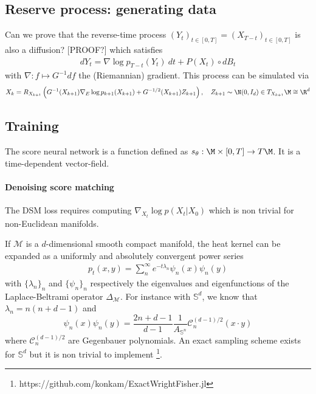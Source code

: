 \subsection{Reserve process: generating data}
Can we prove that the reverse-time process $(Y_t)_{t \in [0,T]} = (X_{T-t})_{t \in [0,T]}$ is also a diffusion? [PROOF?] which satisfies
%
\begin{align}
dY_t = \nabla \log p_{T-t}(Y_t) ~dt + P(X_t) \circ dB_t
\end{align}
with $\nabla: f \mapsto  G^{-1} df$ the (Riemannian) gradient.
%
This process can be simulated via
\begin{align}
X_{k} = R_{X_{k+1}} \left(G^{-1}(X_{k+1}) \nabla_E \log p_{k+1}(X_{k+1}) + G^{-1/2}(X_{k+1}) Z_{k+1} \right), \quad Z_{k+1} \sim \N(0, I_d) \in T_{X_{k+1}}\M \cong \R^d
\end{align}


\subsection{Training}
%
The score neural network is a function defined as $s_\theta: \M \times [0, T] \rightarrow T\M$.
It is a time-dependent vector-field.

\paragraph{Denoising score matching}

The DSM loss requires computing $\nabla_{X_t} \log p(X_t|X_0)$ which is non trivial for non-Euclidean manifolds.

If $\mathcal{M}$ is a $d$-dimensional smooth compact manifold, the heat kernel can be expanded as a uniformly and absolutely convergent power series \citep{jones2008Manifold,li2019Variational}
\begin{align} \label{eq:heat_kernel}
p_t(x, y) = \sum^\infty_n e^{-t \lambda_n} \psi_n(x) \psi_n(y)
\end{align}
with $\{\lambda_n\}_n$ and $\{\psi_n\}_n$ respectively the eigenvalues and eigenfunctions of the Laplace-Beltrami operator $\Delta_\mathcal{M}$.
For instance with $\mathbb{S}^d$, we know \citep{borovitskiy2020Matern,devito2019Reproducing,zhao2018Exact} that $\lambda_n = n(n + d - 1)$ and $$\psi_n(x) \psi_n(y) = \frac{2n+d-1}{d-1} \frac{1}{A_{\mathbb{S}^n}} \mathcal{C}_n^{(d-1)/2}(x \cdot y)$$  where $\mathcal{C}_n^{(d-1)/2}$ are Gegenbauer polynomials.
An exact sampling scheme exists for $\mathbb{S}^d$ \cite{mijatovic2020note} but it is non trivial to implement \footnote{https://github.com/konkam/ExactWrightFisher.jl}.

